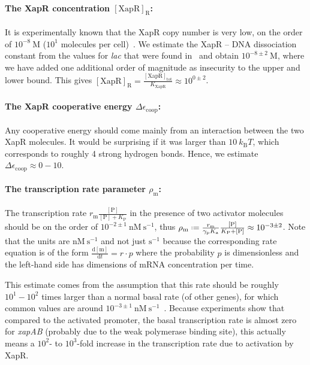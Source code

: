 \documentclass[10pt,letterpaper]{article}
\newcommand{\n}[1]{\mathrm{#1}}
\newcommand{\dd}[2]{\frac{\mathrm{d} #1}{\mathrm{d} #2}}
\newcommand*{\defeq}{\mathrel{\vcenter{\baselineskip0.5ex \lineskiplimit0pt
			\hbox{\scriptsize.}\hbox{\scriptsize.}}}%
	=}
\begin{document}
\paragraph*{The XapR concentration $\n{[XapR]_R}$:} 
It is experimentally known that the XapR copy number is very low, on the
order of $10^{-8}~\n{M}$ ($10^1$ molecules per cell)~\cite{Li2014}. We
estimate the XapR -- DNA dissociation constant from the values for
\emph{lac} that were found in~\cite{RazoMejia2018} and obtain $10^{-8 \pm
2}~\n{M}$, where we have added one additional order of magnitude as
insecurity to the upper and lower bound. This gives
$\n{[XapR]_R}=\frac{\n{[XapR]_{\n{tot}}}}{K_{\n{XapR}}} \approx 10^{0 \pm
2}$.

\paragraph*{The XapR cooperative energy $\Delta \epsilon_{\n{coop}}$:}
Any cooperative energy should come mainly from an interaction between the
two XapR molecules. It would be surprising if it was larger than $10 \
k_{\n{B}} T$, which corresponds to roughly 4 strong hydrogen bonds. Hence,
we estimate $\Delta \epsilon_{\n{coop}} \approx 0 - 10$.

\paragraph*{The transcription rate parameter $\rho_{\n{m}}$:} The
transcription rate $r_{\n{m}} \frac{\n{[P]}}{\n{[P]} + K_{\n{P}}}$ in the
presence of two activator molecules should be on the order of $10^{-2 \pm
1}~\n{nM\ s^{-1}}$, thus $\rho_{\n{m}} \defeq
\frac{r_{\n{m}}}{\gamma_{\n{p}} K_{\n{a}}} \frac{\n{[P]}}{K_{\n{P}}+\n{[P]}}
\approx 10^{-3 \pm 2}$. Note that the units are $\n{nM\ s^{-1}}$ and not
just $\n{s^{-1}}$ because the corresponding rate equation is of the form
$\dd{\n{[m]}}{t} = r \cdot p$ where the probability $p$ is dimensionless and
the left-hand side has dimensions of mRNA concentration per time. 

This estimate comes from the assumption that this rate should be roughly
$10^{1} - 10^{2}$ times larger than a normal basal rate (of other genes),
for which common values are around $10^{-3 \pm 1}~\n{nM\
s^{-1}}$~\cite{Milo2016}. Because experiments show that compared to the
activated promoter, the basal transcription rate is almost zero for
\emph{xapAB} (probably due to the weak polymerase binding site), this
actually means a $10^{2}$- to $10^{3}$-fold increase in the transcription
rate due to activation by XapR. 
\end{document}

